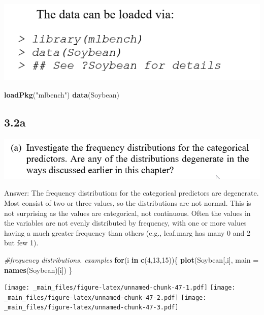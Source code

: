 \documentclass[]{book}
\newenvironment{Shaded}{\begin{snugshade}}{\end{snugshade}}
\newcommand{\CommentTok}[1]{\textcolor[rgb]{0.56,0.35,0.01}{\textit{#1}}}
\newcommand{\ControlFlowTok}[1]{\textcolor[rgb]{0.13,0.29,0.53}{\textbf{#1}}}
\newcommand{\DataTypeTok}[1]{\textcolor[rgb]{0.13,0.29,0.53}{#1}}
\newcommand{\DecValTok}[1]{\textcolor[rgb]{0.00,0.00,0.81}{#1}}
\newcommand{\KeywordTok}[1]{\textcolor[rgb]{0.13,0.29,0.53}{\textbf{#1}}}
\newcommand{\NormalTok}[1]{#1}
\newcommand{\StringTok}[1]{\textcolor[rgb]{0.31,0.60,0.02}{#1}}
\begin{document}
\includegraphics{./week3/3.2cont.png}

\begin{Shaded}
\begin{Highlighting}[]
\KeywordTok{loadPkg}\NormalTok{(}\StringTok{"mlbench"}\NormalTok{)}
\KeywordTok{data}\NormalTok{(Soybean)}
\end{Highlighting}
\end{Shaded}

\hypertarget{a-5}{%
\subsection{3.2a}\label{a-5}}

\includegraphics{./week3/3.2a.png}

Answer: The frequency distributions for the categorical predictors are degenerate. Most consist of two or three values, so the distributions are not normal. This is not surprising as the values are categorical, not continuous. Often the values in the variables are not evenly distributed by frequency, with one or more values having a much greater frequency than others (e.g., leaf.marg has many 0 and 2 but few 1).

\begin{Shaded}
\begin{Highlighting}[]
\CommentTok{#frequency distributions.  examples}
\ControlFlowTok{for}\NormalTok{(i }\ControlFlowTok{in} \KeywordTok{c}\NormalTok{(}\DecValTok{4}\NormalTok{,}\DecValTok{13}\NormalTok{,}\DecValTok{15}\NormalTok{))\{}
  \KeywordTok{plot}\NormalTok{(Soybean[,i], }\DataTypeTok{main =} \KeywordTok{names}\NormalTok{(Soybean)[i])}
\NormalTok{\}}
\end{Highlighting}
\end{Shaded}

\texttt{[image: \_main\_files/figure-latex/unnamed-chunk-47-1.pdf]} \texttt{[image: \_main\_files/figure-latex/unnamed-chunk-47-2.pdf]} \texttt{[image: \_main\_files/figure-latex/unnamed-chunk-47-3.pdf]}
\end{document}
